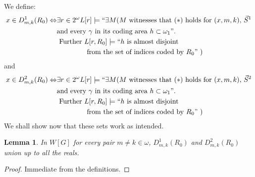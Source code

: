 \documentclass[a4paper,11pt]{article}
\newtheorem{lemma}[theorem]{Lemma}
\begin{document}
We define:
\begin{align*}
 x \in D_{m,k}^1(R_0) \Leftrightarrow &\exists r \in 2^{\omega} L[r] \models  ``\exists M  (\text{$M$ witnesses that }(\ast) \text{ holds for $(x,m,k)$,  $\vec{S}^1$}\\ & \text{and every $\gamma$ in its coding area $h \subset \omega_1"$}. 
  \\& \text{ Further } L[r,R_0] \models ``h  \text{ is almost disjoint} \\&  \qquad \qquad \text{ from the set of indices coded by $R_0"$ )}
\end{align*}
and
\begin{align*}
  x \in D_{m,k}^2(R_0) \Leftrightarrow &\exists r \in 2^{\omega} L[r] \models  ``\exists M  (\text{$M$ witnesses that }(\ast) \text{ holds for $(x,m,k)$,  $\vec{S}^2$}\\ & \text{and every $\gamma$ in its coding area $h \subset \omega_1"$}. 
  \\& \text{ Further } L[r,R_0] \models ``h  \text{ is almost disjoint} \\&  \qquad \qquad \text{ from the set of indices coded by $R_0"$ )}
\end{align*}
We shall show now that these sets work as intended.
\begin{lemma}
In $W[G]$ for every pair $m \ne k \in {\omega}$, $D^1_{m,k}(R_0)$ and $D_{m,k}^2(R_0)$ union up to all the reals.
\end{lemma}
\begin{proof}
Immediate from the definitions.
\end{proof}
\end{document}
